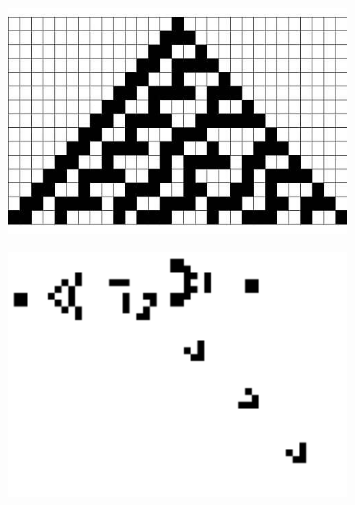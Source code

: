 \documentclass[12,french]{report}
\begin{document}
\begin{titlepage}
\begin{center}
\begin{figure}[H]
    \begin{minipage}[c]{.46\linewidth}
        \centering
        \includegraphics[width=0.8\textwidth]{./Images/2}\\[0.9 cm]
    \end{minipage}
    \hfill%
    \begin{minipage}[c]{.46\linewidth}
        \centering
        \includegraphics[width=0.8\textwidth]{./Images/1}\\[0.9 cm]
    \end{minipage}
\end{figure}\vspace{0.6cm}


\end{center}
\end{titlepage}
\end{document}
